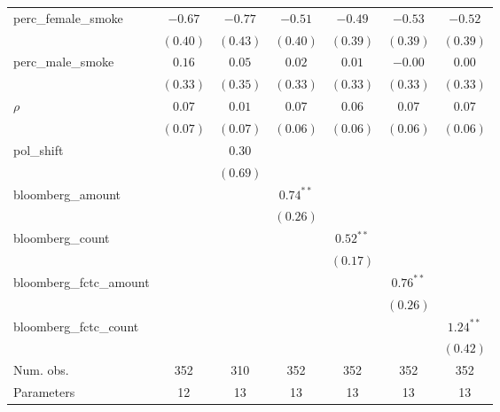 \begin{table}[!h]
\begin{center}
\begin{tabular}{l c c c c c c }
perc\_female\_smoke     & $-0.67$     & $-0.77$    & $-0.51$     & $-0.49$     & $-0.53$     & $-0.52$     \\
                        & $(0.40)$    & $(0.43)$   & $(0.40)$    & $(0.39)$    & $(0.39)$    & $(0.39)$    \\
perc\_male\_smoke       & $0.16$      & $0.05$     & $0.02$      & $0.01$      & $-0.00$     & $0.00$      \\
                        & $(0.33)$    & $(0.35)$   & $(0.33)$    & $(0.33)$    & $(0.33)$    & $(0.33)$    \\
$\rho$                  & $0.07$      & $0.01$     & $0.07$      & $0.06$      & $0.07$      & $0.07$      \\
                        & $(0.07)$    & $(0.07)$   & $(0.06)$    & $(0.06)$    & $(0.06)$    & $(0.06)$    \\
pol\_shift              &             & $0.30$     &             &             &             &             \\
                        &             & $(0.69)$   &             &             &             &             \\
bloomberg\_amount       &             &            & $0.74^{**}$ &             &             &             \\
                        &             &            & $(0.26)$    &             &             &             \\
bloomberg\_count        &             &            &             & $0.52^{**}$ &             &             \\
                        &             &            &             & $(0.17)$    &             &             \\
bloomberg\_fctc\_amount &             &            &             &             & $0.76^{**}$ &             \\
                        &             &            &             &             & $(0.26)$    &             \\
bloomberg\_fctc\_count  &             &            &             &             &             & $1.24^{**}$ \\
                        &             &            &             &             &             & $(0.42)$    \\
\midrule
Num. obs.               & 352         & 310        & 352         & 352         & 352         & 352         \\
Parameters              & 12          & 13         & 13          & 13          & 13          & 13          \\

\end{tabular}
\end{center}
\end{table}
